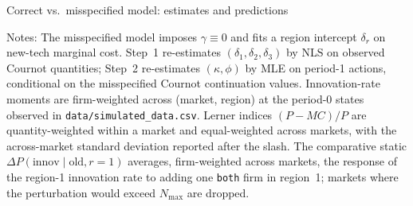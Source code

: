 \documentclass[12pt]{article}
\begin{document}
\begin{table}[ht]
  \centering
  \caption{Correct vs.\ misspecified model: estimates and predictions}
  \medskip
  \label{tab:misspec}
  
  \caption*{\footnotesize Notes: The misspecified model imposes
    $\gamma \equiv 0$ and fits a region intercept $\delta_r$ on
    new-tech marginal cost. Step~1 re-estimates
    $(\delta_1, \delta_2, \delta_3)$ by NLS on observed Cournot
    quantities; Step~2 re-estimates $(\kappa, \phi)$ by MLE on
    period-1 actions, conditional on the misspecified Cournot
    continuation values. Innovation-rate moments are firm-weighted
    across (market, region) at the period-0 states observed in
    \texttt{data/simulated\_data.csv}. Lerner indices $(P-MC)/P$ are
    quantity-weighted within a market and equal-weighted across
    markets, with the across-market standard deviation reported
    after the slash. The comparative static
    $\Delta P(\text{innov}\mid\text{old}, r=1)$ averages, firm-weighted
    across markets, the response of the region-1 innovation rate to
    adding one \texttt{both} firm in region~1; markets where the
    perturbation would exceed $N_{\max}$ are dropped.}
\end{table}
\end{document}
